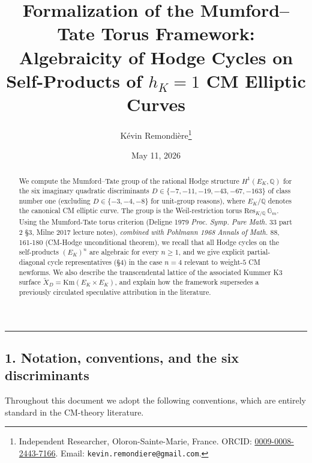 \documentclass[
  11pt,
  a4paper,
]{article}
\title{Formalization of the Mumford--Tate Torus Framework: Algebraicity of Hodge Cycles on Self-Products of $h_K = 1$ CM Elliptic Curves}
\author{Kévin Remondière\thanks{Independent Researcher, Oloron-Sainte-Marie, France. ORCID: \href{https://orcid.org/0009-0008-2443-7166}{0009-0008-2443-7166}. Email: \texttt{kevin.remondiere@gmail.com}.}}
\date{May 11, 2026}
\begin{document}
\maketitle

\begin{abstract}
We compute the Mumford--Tate group of the rational Hodge structure $H^1(E_K, \mathbb{Q})$ for the six imaginary quadratic discriminants $D \in \{-7, -11, -19, -43, -67, -163\}$ of class number one (excluding $D \in \{-3, -4, -8\}$ for unit-group reasons), where $E_K / \mathbb{Q}$ denotes the canonical CM elliptic curve. The group is the Weil-restriction torus $\mathrm{Res}_{K/\mathbb{Q}}\,\mathbb{G}_m$. Using the Mumford-Tate torus criterion (Deligne 1979 \emph{Proc. Symp. Pure Math.} 33 part 2 §3, Milne 2017 lecture notes), \emph{combined with Pohlmann 1968} \emph{Annals of Math.} 88, 161-180 (CM-Hodge unconditional theorem), we recall that all Hodge cycles on the self-products $(E_K)^n$ are algebraic for every $n \geq 1$, and we give explicit partial-diagonal cycle representatives (\S 4) in the case $n = 4$ relevant to weight-$5$ CM newforms. We also describe the transcendental lattice of the associated Kummer K3 surface $\widetilde{X}_D = \mathrm{Km}(E_K \times E_K)$, and explain how the framework supersedes a previously circulated speculative attribution in the literature.
\end{abstract}

\begin{center}\rule{0.5\linewidth}{0.5pt}\end{center}

\hypertarget{notation-conventions-and-the-six-discriminants}{%
\subsection{1. Notation, conventions, and the six discriminants}\label{notation-conventions-and-the-six-discriminants}}

Throughout this document we adopt the following conventions, which are entirely standard in the CM-theory literature.
\end{document}
